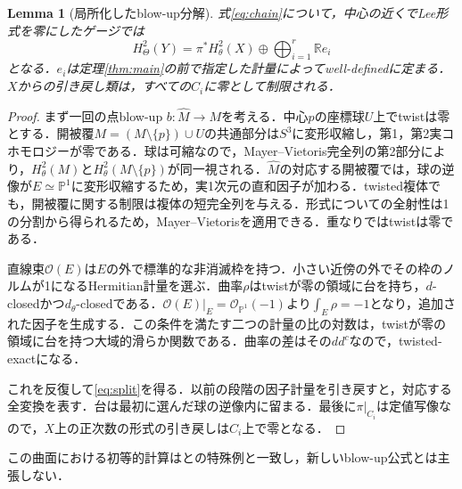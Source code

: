 \documentclass[12pt]{amsart}
\newtheorem{lem}[thm]{Lemma}
\theoremstyle{definition}
\theoremstyle{remark}
\numberwithin{equation}{section}
\newcommand{\cO}{\mathcal{O}}
\newcommand{\R}{\mathbb{R}}
\newcommand{\mP}{\mathbb{P}}
\begin{document}
\begin{lem}[局所化したblow-up分解]\label{lem:cohomology}
式\eqref{eq:chain}について，中心の近くでLee形式を零にしたゲージでは
\begin{equation}\label{eq:split}
 H^2_\Theta(Y)=\pi^*H^2_\theta(X)\oplus\bigoplus_{i=1}^r\R e_i
\end{equation}
となる．$e_i$は定理\ref{thm:main}の前で指定した計量によってwell-definedに定まる．$X$からの引き戻し類は，すべての$C_i$に零として制限される．
\end{lem}
\begin{proof}
まず一回の点blow-up $b:\widehat M\to M$を考える．中心$p$の座標球$U$上でtwistは零とする．開被覆$M=(M\setminus\{p\})\cup U$の共通部分は$S^3$に変形収縮し，第1，第2実コホモロジーが零である．球は可縮なので，Mayer--Vietoris完全列の第2部分により，$H^2_\theta(M)$と$H^2_\theta(M\setminus\{p\})$が同一視される．$\widehat M$の対応する開被覆では，球の逆像が$E\simeq\mP^1$に変形収縮するため，実1次元の直和因子が加わる．twisted複体でも，開被覆に関する制限は複体の短完全列を与える．形式についての全射性は1の分割から得られるため，Mayer--Vietorisを適用できる．重なりではtwistは零である．

直線束$\cO(E)$は$E$の外で標準的な非消滅枠を持つ．小さい近傍の外でその枠のノルムが1になるHermitian計量を選ぶ．曲率$\rho$はtwistが零の領域に台を持ち，$d$-closedかつ$d_\theta$-closedである．$\cO(E)|_E=\cO_{\mP^1}(-1)$より$\int_E\rho=-1$となり，追加された因子を生成する．この条件を満たす二つの計量の比の対数は，twistが零の領域に台を持つ大域的滑らか関数である．曲率の差はその$dd^c$なので，twisted-exactになる．

これを反復して\eqref{eq:split}を得る．以前の段階の因子計量を引き戻すと，対応する全変換を表す．台は最初に選んだ球の逆像内に留まる．最後に$\pi|_{C_i}$は定値写像なので，$X$上の正次数の形式の引き戻しは$C_i$上で零となる．
\end{proof}
この曲面における初等的計算は\cite[Theorem 1.1]{YZ}と\cite[Theorem 1.2]{Meng}の特殊例と一致し，新しいblow-up公式とは主張しない．
\end{document}
